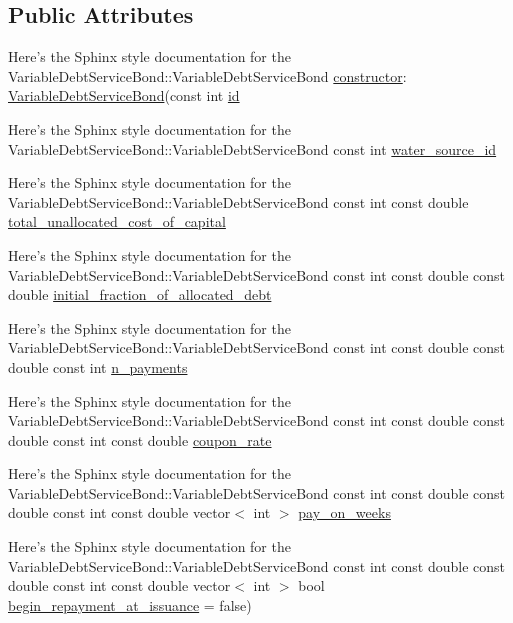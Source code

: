 \subsection*{Public Attributes}
\begin{DoxyCompactItemize}
\item 
Here’s the Sphinx style documentation for the Variable\+Debt\+Service\+Bond\+::\+Variable\+Debt\+Service\+Bond \mbox{\hyperlink{classVariableDebtServiceBond_a9369eb5b081c45a8608630b3eacae979}{constructor}}\+: \mbox{\hyperlink{classVariableDebtServiceBond}{Variable\+Debt\+Service\+Bond}}(const int \mbox{\hyperlink{classBond_a7f75bcafbc16676ad6dbafbf40afae4a}{id}}
\item 
Here’s the Sphinx style documentation for the Variable\+Debt\+Service\+Bond\+::\+Variable\+Debt\+Service\+Bond const int \mbox{\hyperlink{classVariableDebtServiceBond_a1b43195523e5571e04f2ed558497ab6a}{water\+\_\+source\+\_\+id}}
\item 
Here’s the Sphinx style documentation for the Variable\+Debt\+Service\+Bond\+::\+Variable\+Debt\+Service\+Bond const int const double \mbox{\hyperlink{classVariableDebtServiceBond_ac011dd32658be19f8dfc72e7d3b1e02c}{total\+\_\+unallocated\+\_\+cost\+\_\+of\+\_\+capital}}
\item 
Here’s the Sphinx style documentation for the Variable\+Debt\+Service\+Bond\+::\+Variable\+Debt\+Service\+Bond const int const double const double \mbox{\hyperlink{classVariableDebtServiceBond_a23f451bb14e4898aaa585fbeae9667f9}{initial\+\_\+fraction\+\_\+of\+\_\+allocated\+\_\+debt}}
\item 
Here’s the Sphinx style documentation for the Variable\+Debt\+Service\+Bond\+::\+Variable\+Debt\+Service\+Bond const int const double const double const int \mbox{\hyperlink{classVariableDebtServiceBond_ab4035559da3d8155d792612e628285ae}{n\+\_\+payments}}
\item 
Here’s the Sphinx style documentation for the Variable\+Debt\+Service\+Bond\+::\+Variable\+Debt\+Service\+Bond const int const double const double const int const double \mbox{\hyperlink{classVariableDebtServiceBond_a4062feaf0e15546bbcf575aa8ec372e0}{coupon\+\_\+rate}}
\item 
Here’s the Sphinx style documentation for the Variable\+Debt\+Service\+Bond\+::\+Variable\+Debt\+Service\+Bond const int const double const double const int const double vector$<$ int $>$ \mbox{\hyperlink{classVariableDebtServiceBond_a9ba0adce7f7b3f30e14e55837424ff7c}{pay\+\_\+on\+\_\+weeks}}
\item 
Here’s the Sphinx style documentation for the Variable\+Debt\+Service\+Bond\+::\+Variable\+Debt\+Service\+Bond const int const double const double const int const double vector$<$ int $>$ bool \mbox{\hyperlink{classVariableDebtServiceBond_a24b333de66efd610ef5d94a673250ff9}{begin\+\_\+repayment\+\_\+at\+\_\+issuance}} = false)
\end{DoxyCompactItemize}
